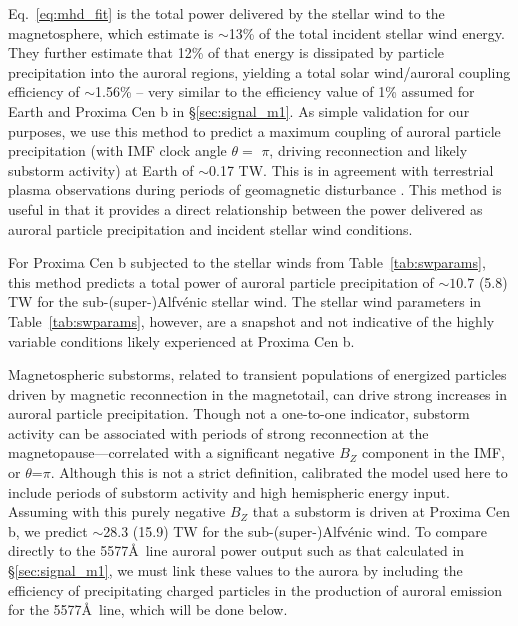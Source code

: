 \documentclass{emulateapj}
\newcommand{\XXX}[1]{#1}      %
\begin{document}
\XXX{Eq.~\ref{eq:mhd_fit} is the total power delivered by the stellar wind to the magnetosphere, which \citet{Wang2014} estimate is $\sim$13\% of the total incident stellar wind energy.} They further estimate that 12\% of that energy is dissipated by particle precipitation into the auroral regions, yielding a total solar wind/auroral coupling efficiency of $\sim$1.56\% -- very similar to the efficiency value \XXX{of 1\% assumed for Earth and Proxima Cen b} in \S\ref{sec:signal_m1}. \XXX{As simple validation for our purposes, we use this method to predict a maximum coupling of auroral particle precipitation (with IMF clock angle $\theta =$ $\pi$, driving reconnection and likely substorm activity) at Earth of $\sim$0.17 TW. This is in agreement with terrestrial plasma observations during periods of geomagnetic disturbance \citep[e.g.][]{Hubert2002}. This method is useful in that it provides a direct relationship between the power delivered as auroral particle precipitation and incident stellar wind conditions.}


\XXX{For Proxima Cen b subjected to the stellar winds from Table~\ref{tab:swparams}, this method predicts a total power of auroral particle precipitation of ${\sim} 10.7$ (5.8) TW for the sub-\mbox{(super-)}Alfv\'{e}nic stellar wind. The stellar wind parameters in Table~\ref{tab:swparams}, however, are a snapshot and not indicative of the highly variable conditions likely experienced at Proxima Cen b.}

\XXX{Magnetospheric substorms, related to transient populations of energized particles driven by magnetic reconnection in the magnetotail, can drive strong increases in auroral particle precipitation. Though not a one-to-one indicator, substorm activity can be associated with periods of strong reconnection at the magnetopause---correlated with a significant negative $B_Z$ component in the IMF, or $\theta$=$\pi$. Although this is not a strict definition, \citet{Wang2014} calibrated the model used here to include periods of substorm activity and high hemispheric energy input. Assuming with this purely negative $B_Z$ that a substorm is driven at Proxima Cen b, we predict $\sim$28.3 (15.9) TW for the sub-\mbox{(super-)}Alfv\'{e}nic wind. To compare directly to the 5577\AA\ line auroral power output such as that calculated in \S\ref{sec:signal_m1}, we must link these values to the aurora by including the efficiency of precipitating charged particles in the production of auroral emission for the 5577\AA\ line, which will be done below.}
\end{document}
